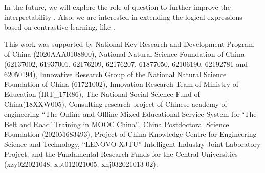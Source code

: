 \documentclass[sigconf]{acmart}
\begin{document}
In the future, we will explore the role of question to further improve the interpretability \cite{thayaparan2020survey}. Also, we are interested in extending the logical expressions based on contrastive learning, like \cite{lin2021contrastive}.

\begin{acks}
	This work was supported by National Key Research and Development Program of 
	China (2020AAA0108800),
	National Natural Science Foundation of China (62137002, 61937001, 62176209, 
	62176207, 61877050, 62106190, 62192781 and 62050194),
	Innovative Research Group of the National Natural Science Foundation of 
	China (61721002),
	Innovation Research Team of Ministry of Education (IRT\_17R86),
	The National Social Science Fund of China(18XXW005),
	Consulting research project of Chinese academy of engineering ``The Online 
	and Offline Mixed Educational Service System for `The Belt and Road' 
	Training in MOOC China'',
	China Postdoctoral Science Foundation (2020M683493),
	Project of China Knowledge Centre for Engineering Science and Technology,
    ``LENOVO-XJTU'' Intelligent Industry Joint Laboratory Project,
	and the Fundamental Research Funds for the Central Universities 
	(xzy022021048, xpt012021005, xhj032021013-02).
\end{acks}

\newpage


\end{document}
